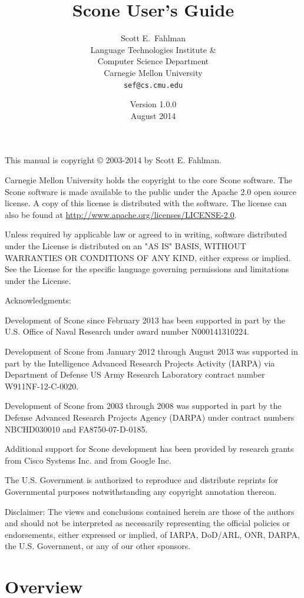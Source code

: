 \documentclass[titlepage,twoside,openright,11pt]{article}
\title{Scone User's Guide}
\author{Scott E.\ Fahlman\\[6pt]
  Language Technologies Institute \&\\
  Computer Science Department\\
  Carnegie Mellon University\\[6pt]
  \texttt{sef@cs.cmu.edu}}
\date{Version 1.0.0 \\[4pt] August 2014}
\begin{document}
\maketitle

This manual is copyright © 2003-2014 by Scott E. Fahlman.

Carnegie Mellon University holds the copyright to the core Scone
software. The Scone software is made available to the public under the
Apache 2.0 open source license. A copy of this license is distributed
with the software. The license can also be found at
\url{http://www.apache.org/licenses/LICENSE-2.0}.

Unless required by applicable law or agreed to in writing, software
distributed under the License is distributed on an "AS IS" BASIS,
WITHOUT WARRANTIES OR CONDITIONS OF ANY KIND, either express or implied.
See the License for the specific language governing permissions and
limitations under the License.

Acknowledgments:

Development of Scone since February 2013 has been supported in part by
the U.S. Office of Naval Research under award number N000141310224.

Development of Scone from January 2012 through August 2013 was supported
in part by the Intelligence Advanced Research Projects Activity (IARPA)
via Department of Defense US Army Research Laboratory contract number
W911NF-12-C-0020.

Development of Scone from 2003 through 2008 was supported in part by the
Defense Advanced Research Projects Agency (DARPA) under contract numbers
NBCHD030010 and FA8750-07-D-0185.

Additional support for Scone development has been provided by research
grants from Cisco Systems Inc. and from Google Inc.

The U.S. Government is authorized to reproduce and distribute reprints
for Governmental purposes notwithstanding any copyright annotation
thereon.

Disclaimer: The views and conclusions contained herein are those of the
authors and should not be interpreted as necessarily representing the
official policies or endorsements, either expressed or implied, of
IARPA, DoD/ARL, ONR, DARPA, the U.S. Government, or any of our other
sponsors.

\cleardoublepage
\tableofcontents
\cleardoublepage

\section{Overview}\label{overview}
\end{document}
